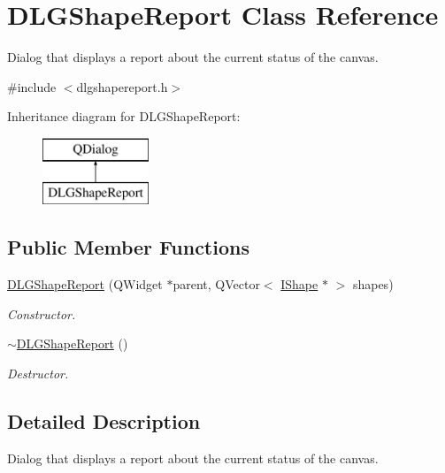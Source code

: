\hypertarget{class_d_l_g_shape_report}{}\section{D\+L\+G\+Shape\+Report Class Reference}
\label{class_d_l_g_shape_report}


Dialog that displays a report about the current status of the canvas.  




{\ttfamily \#include $<$dlgshapereport.\+h$>$}

Inheritance diagram for D\+L\+G\+Shape\+Report\+:\begin{figure}[H]
\begin{center}
\leavevmode
\includegraphics[height=2.000000cm]{class_d_l_g_shape_report}
\end{center}
\end{figure}
\subsection*{Public Member Functions}
\begin{DoxyCompactItemize}
\item 
\mbox{\hyperlink{class_d_l_g_shape_report_a9c117a45f345cf9a2c35dd3d73ac3c74}{D\+L\+G\+Shape\+Report}} (Q\+Widget $\ast$parent, Q\+Vector$<$ \mbox{\hyperlink{class_i_shape}{I\+Shape}} $\ast$ $>$ shapes)
\begin{DoxyCompactList}\small\item\em Constructor. \end{DoxyCompactList}\item 
\mbox{\hyperlink{class_d_l_g_shape_report_ab32053bd02b4591171a8332f47020b31}{$\sim$\+D\+L\+G\+Shape\+Report}} ()
\begin{DoxyCompactList}\small\item\em Destructor. \end{DoxyCompactList}\end{DoxyCompactItemize}


\subsection{Detailed Description}
Dialog that displays a report about the current status of the canvas. 



